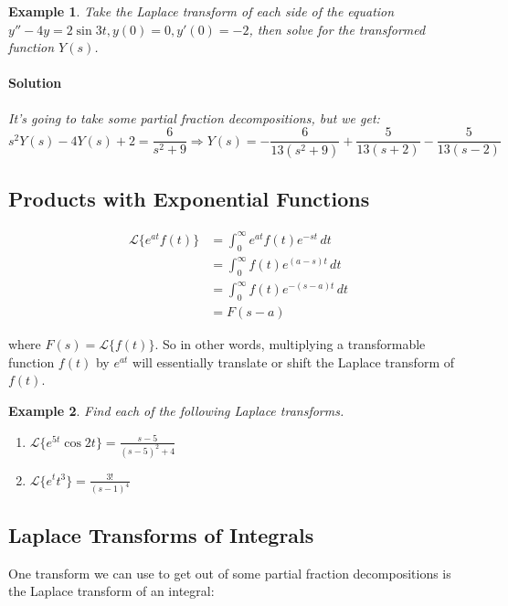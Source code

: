 \documentclass[letterpaper, 11pt, openany]{book}
\theoremstyle{mytheoremstyle}
\theoremstyle{myexamplestyle}
\newtheorem{example}{Example}[section]
\newenvironment{solution}{\paragraph{\sffamily \smaller \fontseries{b}\selectfont Solution}}{\hfill\faSquare}
\begin{document}
\begin{example}\label{e:laplace-xform-equation}
    Take the Laplace transform of each side of the equation \(y'' - 4y = 2\sin 3t, y(0) = 0, y'(0) = -2\), then solve for the transformed function \(Y(s)\).
    \begin{solution}
        It's going to take some partial fraction decompositions, but we get:
        \[ s^2 Y(s)-4 Y(s)+2=\frac{6}{s^2+9} \Rightarrow Y(s) = -\frac{6}{13 \left(s^2+9\right)}+\frac{5}{13 (s+2)}-\frac{5}{13 (s-2)}\]
    \end{solution}
\end{example}

\subsection{Products with Exponential Functions}

\begin{align*}
    \mathcal{L}\{e^{at}f(t)\}   &= \int_0^\infty e^{at} f(t) e^{-st} \, dt\\
                                &= \int_0^\infty f(t) e^{(a-s)t} \, dt\\
                                &= \int_0^\infty f(t) e^{-(s-a)t} \, dt\\
                                &= F(s-a)
\end{align*}

where \(F(s) = \mathcal{L}\{f(t)\}\). So in other words, multiplying a transformable function \(f(t)\) by \(e^{at}\) will essentially translate or shift the Laplace transform of \(f(t)\).

\begin{example}\label{e:Laplace-translated}
    Find each of the following Laplace transforms.
    \begin{enumerate}
        \item \(\displaystyle \mathcal{L}\{e^{5t}\cos 2t\} = \frac{s-5}{(s-5)^2 + 4}\)
        \item \(\displaystyle \mathcal{L}\{e^{t}t^3\} = \frac{3!}{(s-1)^4}\)
    \end{enumerate}
\end{example}

\subsection{Laplace Transforms of Integrals}
One transform we can use to get out of some partial fraction decompositions is the Laplace transform of an integral:
\end{document}

